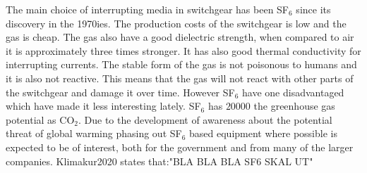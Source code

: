 \documentclass[10pt,a4paper]{article}
\begin{document}
The main choice of interrupting media in switchgear has been SF$_6$ since its discovery in the 1970ies. The production costs of the switchgear is low and the gas is cheap. The gas also have a good dielectric strength, when compared to air it is approximately three times stronger. It has also good thermal conductivity for interrupting currents. The stable form of the gas is not poisonous to humans and it is also not reactive. This means that the gas will not react with other parts of the switchgear and damage it over time. However SF$_6$ have one disadvantaged which have made it less interesting lately. SF$_6$ has $20000$ the greenhouse gas potential as CO$_2$. Due to the development of awareness about the potential threat of global warming phasing out SF$_6$ based equipment where possible is expected to be of interest, both for the government and from many of the larger companies. Klimakur2020 states that:"BLA BLA BLA SF6 SKAL UT"
\end{document}

